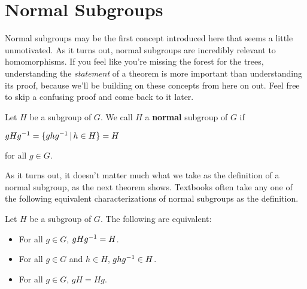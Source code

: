 \section{Normal Subgroups}

Normal subgroups may be the first concept introduced here that seems a little unmotivated. As it turns out, normal subgroups are incredibly relevant to homomorphisms. If you feel like you're missing the forest for the trees, understanding the \textit{statement} of a theorem is more important than understanding its proof, because we'll be building on these concepts from here on out. Feel free to skip a confusing proof and come back to it later.

\begin{definition}
Let $H$ be a subgroup of $G$. We call $H$ a \textbf{normal} subgroup of $G$ if
\begin{center}
    $gHg^{-1} = \{ghg^{-1} \,|\, h \in H\} = H$
\end{center}
for all $g \in G$.
\end{definition}

As it turns out, it doesn't matter much what we take as the definition of a normal subgroup, as the next theorem shows. Textbooks often take any one of the following equivalent characterizations of normal subgroups as the definition.

\begin{theorem}
\label{normaldefs}
Let $H$ be a subgroup of $G$. The following are equivalent:
\begin{itemize}
\item For all $g \in G$, $gHg^{-1} = H$.
\item For all $g \in G$ and $h \in H$, $ghg^{-1} \in H$.
\item For all $g \in G$, $gH = Hg$.
\end{itemize}
\end{theorem}

